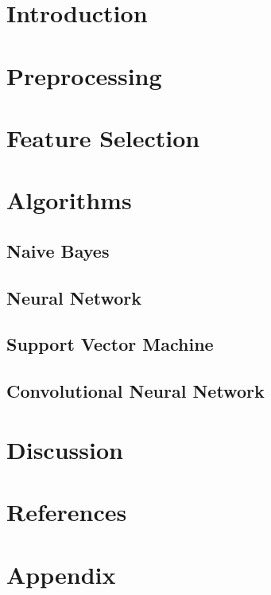 \documentclass[10pt,twocolumn]{article}
\begin{document}
\section{Introduction}
\section{Preprocessing}
\section{Feature Selection}
\section{Algorithms}
\subsection{Naive Bayes}
\subsection{Neural Network}
\subsection{Support Vector Machine}
\subsection{Convolutional Neural Network}
\section{Discussion}
\section{References}
\section{Appendix}
\end{document}
